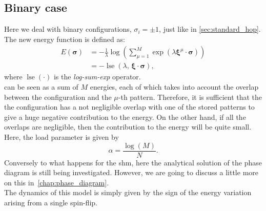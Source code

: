 \documentclass[\rootdir/main.tex]{subfiles}
\begin{document}
\subsection{Binary case}
Here we deal with binary configurations, $\sigma_i = \pm 1$, just like in \cref{sec:standard_hop}.
The new energy function is defined as:
\begin{equation}\label{eq:modern_binary_energy}
\begin{split}
    E\left(\symbf{\sigma} \right) & = - \frac{1}{\lambda} \operatorname{log} \left( \sum_{\mu = 1}^{M} \operatorname{exp}(\lambda \symbf{\xi}^{\mu} \cdot \symbf{\sigma})\right) \\
    & = - \operatorname{lse}(\lambda, \, \symbf{\xi} \cdot \symbf{\sigma}),
\end{split}
\end{equation}
where $\operatorname{lse}(\cdot)$ is the \emph{log-sum-exp} operator.\\
 can be seen as a sum of $M$ energies, each of which takes into account the overlap between the configuration and the $\mu$-th pattern. Therefore, it is sufficient that the the configuration has a not negligible overlap with one of the stored patterns to give a huge negative contribution to the energy. On the other hand, if all the overlaps are negligible, then the contribution to the energy will be quite small.\\
Here, the load parameter is given by
\begin{equation}
    \alpha = \frac{\operatorname{log}(M)}{N}.
\end{equation}
Conversely to what happens for the \acrlong{shm}, here the analytical solution of the phase diagram is still being investigated. However, we are going to discuss a little more on this in~\cref{chap:phase_diagram}.\\
The dynamics of this model is simply given by the sign of the energy variation arising from a single spin-flip.
\end{document}
